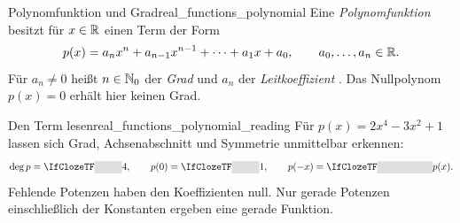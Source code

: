 \par\noindent\begin{minipage}{\linewidth}
\begin{DefinitionBox}{Polynomfunktion und Grad}{real_functions_polynomial}
  Eine \emph{Polynomfunktion}  besitzt
  für $x\in\mathbb{R}$ einen Term der Form
  \[
    p(x)=a_nx^n+a_{n-1}x^{n-1}+\dots+a_1x+a_0,
    \qquad a_0,\dots,a_n\in\mathbb{R}.
  \]
  Für $a_n\ne0$ heißt $n\in\mathbb{N}_0$ der \emph{Grad} 
  und $a_n$ der \emph{Leitkoeffizient} .
  Das Nullpolynom $p(x)=0$ erhält hier keinen Grad.
\end{DefinitionBox}
\begin{ExampleBox}[before skip=0.3\baselineskip]{Den Term lesen}{real_functions_polynomial_reading}
  Für $p(x)=2x^4-3x^2+1$ lassen sich Grad, Achsenabschnitt und Symmetrie
  unmittelbar erkennen:
  \[
    \deg p=\Cloze{1cm}{4},\qquad
    p(0)=\Cloze{1cm}{1},\qquad
    p(-x)=\Cloze{2cm}{p(x)}.
  \]
  Fehlende Potenzen haben den Koeffizienten null. Nur gerade Potenzen
  einschließlich der Konstanten ergeben eine gerade Funktion.
\end{ExampleBox}
\end{minipage}


